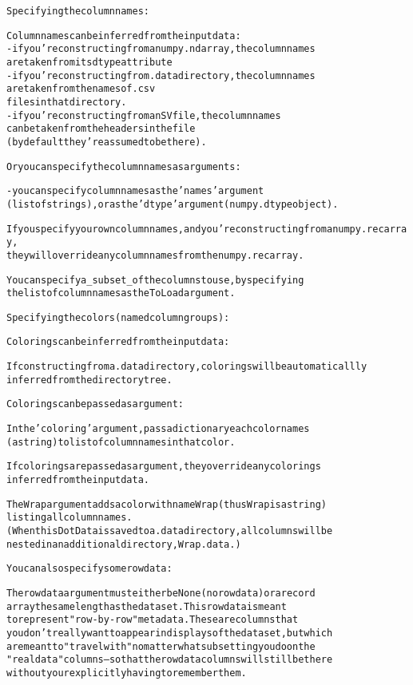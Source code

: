 \begin{boxedminipage}{\funcwidth}
\begin{alltt}
     Specifying the column names:

       Column names can be inferred from the input data:
          - if you're constructing from a numpy.ndarray, the column names 
             are taken from its dtype attribute
          - if you're constructing from .data directory, the column names
             are taken from the names of .csv
          files in that directory.
          - if you're constructing from an SV file, the column names 
             can be taken from the headers in the file
          (by default they're assumed to be there).

       Or you can specify the column names as arguments:   

          - you can specify column names as the 'names' argument 
             (list of strings), or as the 'dtype' argument (numpy.dtype object).
        
       If you specify your own column names, and you're constructing from a numpy.recarray,
       they will override any column names from the numpy.recarray.
        
     You can specify a \_subset\_ of the columns to use, by specifying 
     the list of column names as the ToLoad argument.

     Specifying the colors (named column groups):

Colorings can be inferred from the input data:

       If constructing from a .data directory, colorings will be automaticallly
       inferred from the directory tree.

Colorings can be passed as argument:

       In the 'coloring' argument, pass a dictionary each color names
       (a string) to list of column names in that color.

If colorings are passed as argument, they override any colorings
inferred from the input data.

The Wrap argument adds a color with name Wrap (thus Wrap is a string) 
listing all column names.
(When this DotData is saved to a .data directory, all columns will be
nested in an additional directory, Wrap.data.)

     You can also specify some rowdata:
     
     The rowdata argument must either be None (no rowdata) or a record
     array the same length as the data set.     This rowdata is meant 
     to represent "row-by-row" metadata.   These are columns that
     you don't really want to appear in displays of the data set, but which 
     are meant to "travel with" no matter what subsetting you do on the 
     "real data" columns -- so that the rowdata columns will still be there 
     without your explicitly having to remember them.   


\end{alltt}
\end{boxedminipage}
